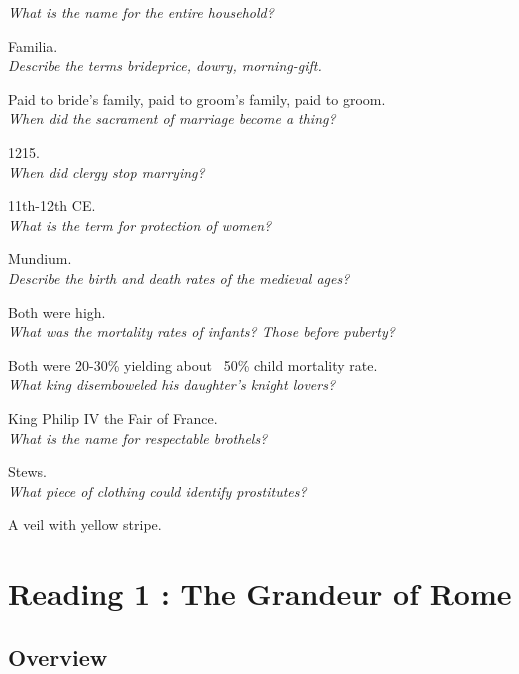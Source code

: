 \documentclass[12pt]{article}
\begin{document}
\textit{What is the name for the entire household?}

Familia.\\

\textit{Describe the terms brideprice, dowry, morning-gift.}

Paid to bride's family, paid to groom's family, paid to groom.\\

\textit{When did the sacrament of marriage become a thing?}

1215.\\

\textit{When did clergy stop marrying?}

11th-12th CE.\\

\textit{What is the term for protection of women?}

Mundium.\\

\textit{Describe the birth and death rates of the medieval ages?}

Both were high.\\

\textit{What was the mortality rates of infants? Those before puberty?}

Both were 20-30\% yielding about ~50\% child mortality rate.\\

\textit{What king disemboweled his daughter's knight lovers?}

King Philip IV the Fair of France.\\

\textit{What is the name for respectable brothels?}

Stews.\\

\textit{What piece of clothing could identify prostitutes?}

A veil with yellow stripe.\\








\section*{Reading 1 : The Grandeur of Rome}

\subsection*{Overview}
\end{document}
